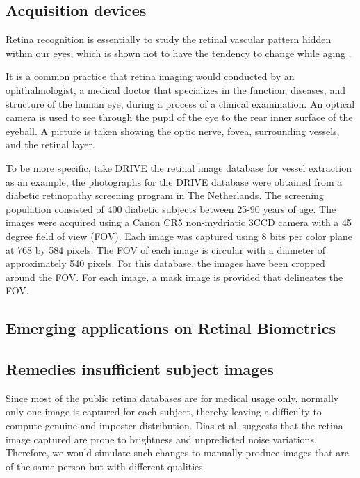 \documentclass[a4paper,11pt]{article}
\theoremstyle{plain} %
\begin{document}
\subsection{Acquisition devices}
Retina recognition is essentially to study the retinal vascular pattern hidden within our eyes, which is shown not to have the tendency to change while aging \cite{fatima2013feature}. 

It is a common practice that retina imaging would conducted by an ophthalmologist, a medical doctor that specializes in the function, diseases, and structure of the human eye, during a process of a clinical examination. An optical camera is used to see through the pupil of the eye to the rear inner surface of the eyeball. A picture is taken showing the optic nerve, fovea, surrounding vessels, and the retinal layer.

To be more specific, take DRIVE the retinal image database for vessel extraction as an example, the photographs for the DRIVE database were obtained from a diabetic retinopathy screening program in The Netherlands. The screening population consisted of 400 diabetic subjects between 25-90 years of age. The images were acquired using a Canon CR5 non-mydriatic 3CCD camera with a 45 degree field of view (FOV). Each image was captured using 8 bits per color plane at 768 by 584 pixels. The FOV of each image is circular with a diameter of approximately 540 pixels. For this database, the images have been cropped around the FOV. For each image, a mask image is provided that delineates the FOV.


\subsection{Emerging applications on Retinal Biometrics}



\subsection{Remedies insufficient subject images}
Since most of the public retina databases are for medical usage only, normally only one image is captured for each subject, thereby leaving a difficulty to compute genuine and imposter distribution. Dias et al. \cite{dias2014retinal} suggests that the retina image captured are prone to brightness and unpredicted noise variations. Therefore, we would simulate such changes to manually produce images that are of the same person but with different qualities. 
\end{document}

